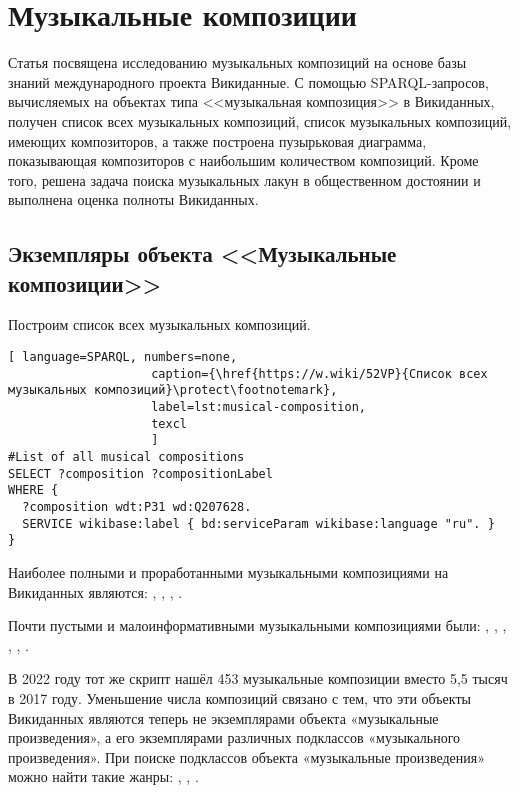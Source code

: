 \chapter{Музыкальные композиции}
\label{ch:musical-composition}
Статья посвящена исследованию музыкальных композиций на основе базы знаний международного проекта Викиданные. С помощью SPARQL-запросов, вычисляемых на объектах типа <<музыкальная композиция>> в Викиданных, получен список всех музыкальных композиций, список музыкальных композиций, имеющих композиторов, а также построена пузырьковая диаграмма, показывающая композиторов с наибольшим количеством композиций. Кроме того, решена задача поиска музыкальных лакун в общественном достоянии и выполнена оценка полноты Викиданных.

\section{Экземпляры объекта <<Музыкальные композиции>>}

Построим список всех музыкальных композиций.

\begin{lstlisting}[ language=SPARQL, numbers=none,
                    caption={\href{https://w.wiki/52VP}{Список всех  музыкальных композиций}\protect\footnotemark},
                    label=lst:musical-composition,
                    texcl 
                    ]
#List of all musical compositions
SELECT ?composition ?compositionLabel 
WHERE {
  ?composition wdt:P31 wd:Q207628.
  SERVICE wikibase:label { bd:serviceParam wikibase:language "ru". }
}
\end{lstlisting}%
Наиболее полными и проработанными музыкальными композициями на Викиданных являются: , , , .

Почти пустыми и малоинформативными музыкальными композициями были: , , , , , .

В 2022 году тот же скрипт нашёл 453 музыкальные композиции вместо 5,5 тысяч в 2017 году. Уменьшение числа композиций связано с тем, что эти объекты Викиданных являются теперь не экземплярами объекта «музыкальные произведения», а его экземплярами различных подклассов «музыкального произведения». При поиске подклассов объекта «музыкальные произведения» можно найти такие жанры: , , .

